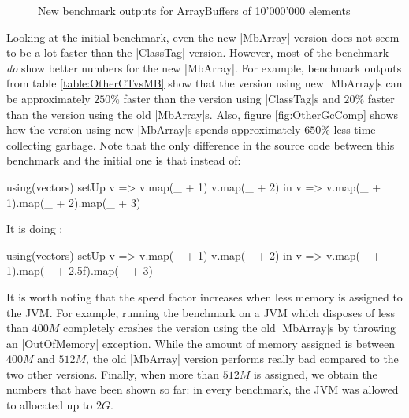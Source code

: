 

\begin{figure}
\caption{New benchmark outputs for ArrayBuffers of 10'000'000 elements}
\label{fig:NewGcComp}
\end{figure}

Looking at the initial benchmark, even the new |MbArray| version does not seem to be a lot faster than the |ClassTag| version. However, most of the benchmark \emph{do} show better numbers for the new |MbArray|. For example, benchmark outputs from table \ref{table:OtherCTvsMB} show that the version using new |MbArray|s can be approximately $250\%$ faster than the version using |ClassTag|s and $20\%$ faster than the version using the old |MbArray|s. Also, figure \ref{fig:OtherGcComp} shows how the version using new |MbArray|s spends approximately $650\%$ less time collecting garbage. Note that the only difference in the source code between this benchmark and the initial one is that instead of:

\begin{lstlisting-nobreak}
  using(vectors) setUp {
    v => 
      v.map(_ + 1)
      v.map(_ + 2)
  } in {
    v => v.map(_ + 1).map(_ + 2).map(_ + 3)
  }
\end{lstlisting-nobreak}

It is doing : 

\begin{lstlisting-nobreak}
  using(vectors) setUp {
    v => 
      v.map(_ + 1)
      v.map(_ + 2)
  } in {
    v => v.map(_ + 1).map(_ + 2.5f).map(_ + 3)
  }
\end{lstlisting-nobreak}

It is worth noting that the speed factor increases when less memory is assigned to the JVM. For example, running the benchmark on a JVM which disposes of less than $400M$ completely crashes the version using the old |MbArray|s by throwing an |OutOfMemory| exception. While the amount of memory assigned is between $400M$ and $512M$, the old |MbArray| version performs really bad compared to the two other versions. Finally, when more than $512M$ is assigned, we obtain the numbers that have been shown so far: in every benchmark, the JVM was allowed to allocated up to $2G$.

